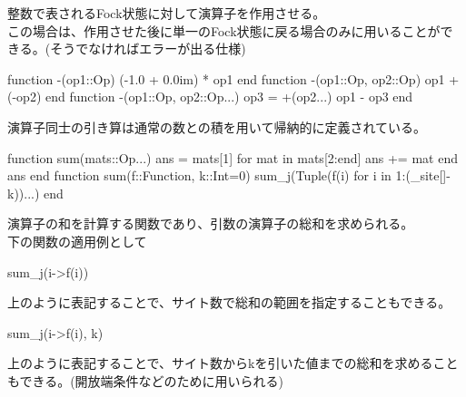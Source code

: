 \documentclass{ltjsarticle}
\begin{document}
整数で表されるFock状態に対して演算子を作用させる。\\
この場合は、作用させた後に単一のFock状態に戻る場合のみに用いることができる。(そうでなければエラーが出る仕様)
\begin{jllisting}
function -(op1::Op)
  (-1.0 + 0.0im) * op1
end
function -(op1::Op, op2::Op)
  op1 + (-op2)
end
function -(op1::Op, op2::Op...)
  op3 = +(op2...)
  op1 - op3
end
\end{jllisting}
演算子同士の引き算は通常の数との積を用いて帰納的に定義されている。
\begin{jllisting}
function sum(mats::Op...)
  ans = mats[1]
  for mat in mats[2:end]
    ans += mat
  end
  ans
end
function sum(f::Function, k::Int=0)
  sum_j(Tuple(f(i) for i in 1:(_site[]-k))...)
end
\end{jllisting}
演算子の和を計算する関数であり、引数の演算子の総和を求められる。\\
下の関数の適用例として
\begin{jllisting}
sum_j(i->f(i))
\end{jllisting}
上のように表記することで、サイト数で総和の範囲を指定することもできる。\\
\begin{jllisting}
sum_j(i->f(i), k)
\end{jllisting}
上のように表記することで、サイト数からkを引いた値までの総和を求めることもできる。(開放端条件などのために用いられる)\\
\end{document}
